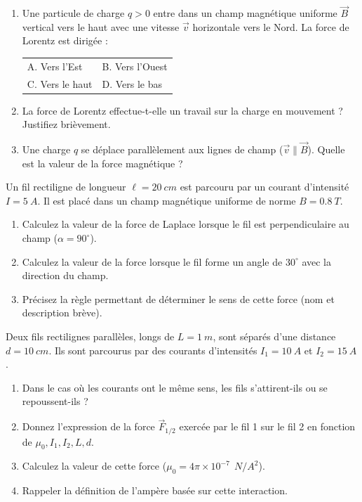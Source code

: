 \documentclass[11pt]{article}
\begin{document}
\begin{exercice}[QCM : Force de Lorentz $\overrightarrow{F} = q\overrightarrow{v} \wedge \overrightarrow{B}$]
\begin{enumerate}
    \item Une particule de charge $q > 0$ entre dans un champ magnétique uniforme $\overrightarrow{B}$ vertical vers le haut avec une vitesse $\overrightarrow{v}$ horizontale vers le Nord. La force de Lorentz est dirigée :\\
    \begin{tabular}{ll}
    A. Vers l'Est & B. Vers l'Ouest \\
    C. Vers le haut & D. Vers le bas
    \end{tabular}
    \item La force de Lorentz effectue-t-elle un travail sur la charge en mouvement ? Justifiez brièvement.
    \item Une charge $q$ se déplace parallèlement aux lignes de champ ($\overrightarrow{v} \parallel \overrightarrow{B}$). Quelle est la valeur de la force magnétique ?
\end{enumerate}
\end{exercice}

\begin{exercice}
Un fil rectiligne de longueur $\ell = \SI{20}{cm}$ est parcouru par un courant d'intensité $I = \SI{5}{A}$. Il est placé dans un champ magnétique uniforme de norme $B = \SI{0,8}{T}$.
\begin{enumerate}
    \item Calculez la valeur de la force de Laplace lorsque le fil est perpendiculaire au champ ($\alpha = 90^\circ$).
    \item Calculez la valeur de la force lorsque le fil forme un angle de $30^\circ$ avec la direction du champ.
    \item Précisez la règle permettant de déterminer le sens de cette force (nom et description brève).
\end{enumerate}
\end{exercice}

\begin{exercice}
Deux fils rectilignes parallèles, longs de $L = \SI{1}{m}$, sont séparés d'une distance $d = \SI{10}{cm}$. Ils sont parcourus par des courants d'intensités $I_1 = \SI{10}{A}$ et $I_2 = \SI{15}{A}$.
\begin{enumerate}
    \item Dans le cas où les courants ont le même sens, les fils s'attirent-ils ou se repoussent-ils ?
    \item Donnez l'expression de la force $\overrightarrow{F}_{1/2}$ exercée par le fil 1 sur le fil 2 en fonction de $\mu_0, I_1, I_2, L, d$.
    \item Calculez la valeur de cette force ($\mu_0 = 4\pi \times 10^{-7}~\SI{}{N/A^2}$).
    \item Rappeler la définition de l'ampère basée sur cette interaction.
\end{enumerate}
\end{exercice}
\end{document}
